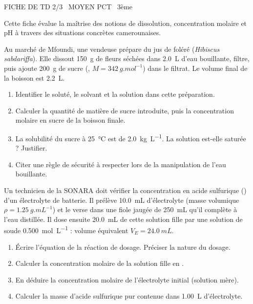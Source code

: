 \documentclass[11pt]{article}
\begin{document}
\begin{tcolorbox}[enhanced,colback=popink,colframe=popink,arc=10pt,boxrule=0pt,left=12pt,right=12pt,top=9pt,bottom=9pt]
{\color{white}\popxbold\small FICHE DE TD 2/3 \textbullet\ MOYEN \hfill PCT \textbullet\ 3ème\par}
\end{tcolorbox}
\vspace{4pt}
Cette fiche évalue la maîtrise des notions de dissolution, concentration molaire et pH à travers des situations concrètes camerounaises.

\begin{exercice}
Au marché de Mfoundi, une vendeuse prépare du jus de foléré (\textit{Hibiscus sabdariffa}). Elle dissout \SI{150}{g} de fleurs séchées dans \SI{2,0}{L} d'eau bouillante, filtre, puis ajoute \SI{200}{g} de sucre (, $M = \SI{342}{g.mol^{-1}}$) dans le filtrat. Le volume final de la boisson est \SI{2,2}{L}.
\begin{enumerate}
    \item Identifier le soluté, le solvant et la solution dans cette préparation.
    \item Calculer la quantité de matière de sucre introduite, puis la concentration molaire en sucre de la boisson finale.
    \item La solubilité du sucre à \SI{25}{\celsius} est de \SI{2,0}{kg.L^{-1}}. La solution est-elle saturée ? Justifier.
    \item Citer une règle de sécurité à respecter lors de la manipulation de l'eau bouillante.
\end{enumerate}
\end{exercice}

\begin{exercice}
Un technicien de la SONARA doit vérifier la concentration en acide sulfurique () d'un électrolyte de batterie. Il prélève \SI{10,0}{mL} d'électrolyte (masse volumique $\rho = \SI{1,25}{g.mL^{-1}}$) et le verse dans une fiole jaugée de \SI{250}{mL} qu'il complète à l'eau distillée. Il dose ensuite \SI{20,0}{mL} de cette solution fille par une solution de soude \SI{0,500}{mol.L^{-1}} : volume équivalent $V_E = \SI{24,0}{mL}$.
\begin{enumerate}
    \item Écrire l'équation de la réaction de dosage. Préciser la nature du dosage.
    \item Calculer la concentration molaire de la solution fille en .
    \item En déduire la concentration molaire de l'électrolyte initial (solution mère).
    \item Calculer la masse d'acide sulfurique pur contenue dans \SI{1,00}{L} d'électrolyte.
\end{enumerate}
\end{exercice}
\end{document}
